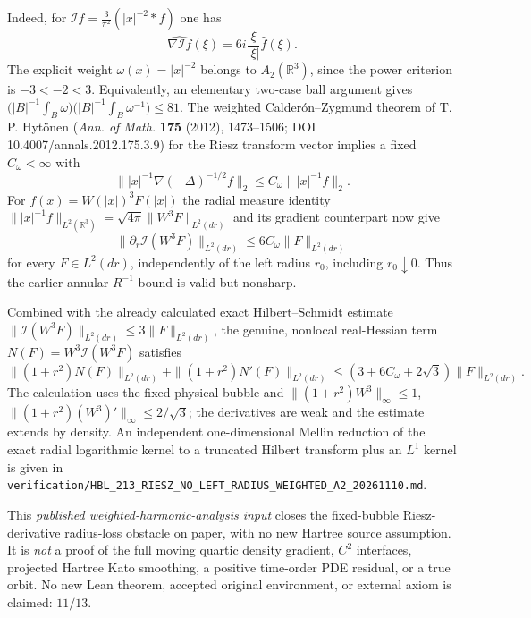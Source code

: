 \documentclass[11pt]{amsart}
\begin{document}
Indeed, for \(\mathcal If=\frac{3}{\pi^2}
(|x|^{-2}*f)\) one has
\[
 \widehat{\nabla\mathcal If}(\xi)
   =6i\frac{\xi}{|\xi|}\widehat f(\xi).
\]
The explicit weight \(\omega(x)=|x|^{-2}\)
belongs to \(A_2(\mathbb R^3)\), since the power
criterion is \(-3<-2<3\). Equivalently, an elementary
two-case ball argument gives
\(\bigl(|B|^{-1}\int_B\omega\bigr)
   \bigl(|B|^{-1}\int_B\omega^{-1}\bigr)\le81\).
The weighted Calder\'on--Zygmund theorem
of T. P. Hyt\"onen
(\emph{Ann. of Math.} \textbf{175} (2012),
1473--1506; DOI 10.4007/annals.2012.175.3.9)
for the Riesz transform vector implies a fixed
\(C_\omega<\infty\) with
\[
 \big\||x|^{-1}\nabla(-\Delta)^{-1/2}f\big\|_2
 \le C_\omega\big\||x|^{-1}f\big\|_2.
\]
For \(f(x)=W(|x|)^3F(|x|)\) the radial
measure identity
\(\||x|^{-1}f\|_{L^2(\mathbb R^3)}
=\sqrt{4\pi}\|W^3F\|_{L^2(dr)}\)
and its gradient counterpart now give
\[
 \boxed{
 \|\partial_r\mathcal I(W^3F)\|_{L^2(dr)}
   \le6C_\omega\|F\|_{L^2(dr)}
 }
\]
for every \(F\in L^2(dr)\), independently
of the left radius \(r_0\), including
\(r_0\downarrow0\). Thus the earlier
annular \(R^{-1}\) bound is valid but nonsharp.

Combined with the already calculated exact
Hilbert--Schmidt estimate
\(\|\mathcal I(W^3F)\|_{L^2(dr)}
\le3\|F\|_{L^2(dr)}\),
the genuine, nonlocal real-Hessian term
\(N(F)=W^3\mathcal I(W^3F)\) satisfies
\[
 \boxed{
 \|(1+r^2)N(F)\|_{L^2(dr)}
 +\|(1+r^2)N'(F)\|_{L^2(dr)}
 \le(3+6C_\omega+2\sqrt3)\|F\|_{L^2(dr)} .
 }
\]
The calculation uses the fixed physical
bubble and \(\|(1+r^2)W^3\|_\infty\le1\),
\(\|(1+r^2)(W^3)'\|_\infty
\le2/\sqrt3\); the derivatives are weak
and the estimate extends by density.
An independent one-dimensional Mellin
reduction of the exact radial logarithmic
kernel to a truncated Hilbert transform
plus an \(L^1\) kernel is given in
\texttt{verification/HBL\_213\_RIESZ\_NO\_LEFT\_RADIUS\_WEIGHTED\_A2\_20261110.md}.

This \emph{published weighted-harmonic-analysis input}
closes the fixed-bubble Riesz-derivative
radius-loss obstacle on paper, with no
new Hartree source assumption. It is
\emph{not} a proof of the full moving
quartic density gradient, \(C^2\) interfaces,
projected Hartree Kato smoothing, a positive
time-order PDE residual, or a true orbit.
No new Lean theorem, accepted original
environment, or external axiom is claimed:
\(11/13\).
\end{document}
